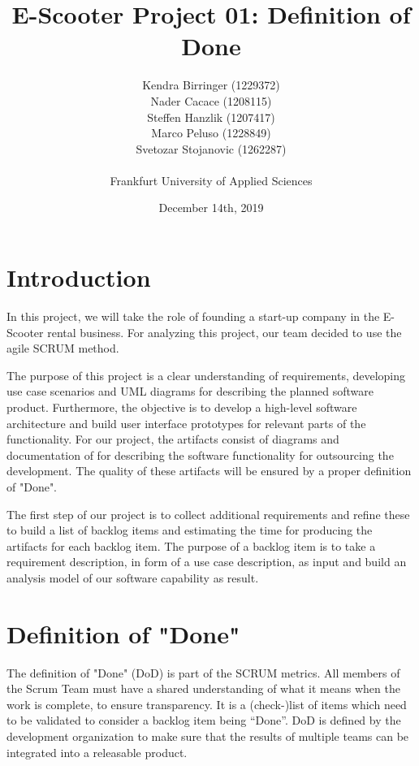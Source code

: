 \documentclass[a4paper, 12pt]{article}
\title{E-Scooter Project 01: Definition of Done}
\author{
    Kendra Birringer (1229372)\\
    Nader Cacace (1208115)\\
    Steffen Hanzlik (1207417)\\
    Marco Peluso (1228849)\\
    Svetozar Stojanovic (1262287)\\
    \\
    Frankfurt University of Applied Sciences
}
\date{December 14th, 2019}
\begin{document}
\maketitle
\newpage
\tableofcontents

\newpage
\section{Introduction}
In this project, we will take the role of founding a start-up company in the E-Scooter rental business.
For analyzing this project, our team decided to use the agile SCRUM method.

The purpose of this project is a clear understanding of requirements, developing use case scenarios and UML diagrams for describing the planned software product.
Furthermore, the objective is to develop a high-level software architecture and build user interface prototypes for relevant parts of the functionality.
For our project, the artifacts consist of diagrams and documentation of for describing the software functionality for outsourcing the development. The quality of these artifacts will be ensured by a proper definition of "Done".

The first step of our project is to collect additional requirements and refine these to build a list of backlog items and estimating the time for producing the artifacts for each backlog item. The purpose of a backlog item is to take a requirement description, in form of a use case description, as input and build an analysis model of our software capability as result.

\section{Definition of "Done"}
The definition of "Done" (DoD) is part of the SCRUM metrics. All members of the Scrum Team must have a shared understanding of what it means when the work is complete, to ensure transparency. \cite{scrumguide}
It is a (check-)list of items which need to be validated to consider a backlog item being “Done”. DoD is defined by the development organization to make sure that the results of multiple teams can be integrated into a releasable product.  \cite{thoma1}
\end{document}
